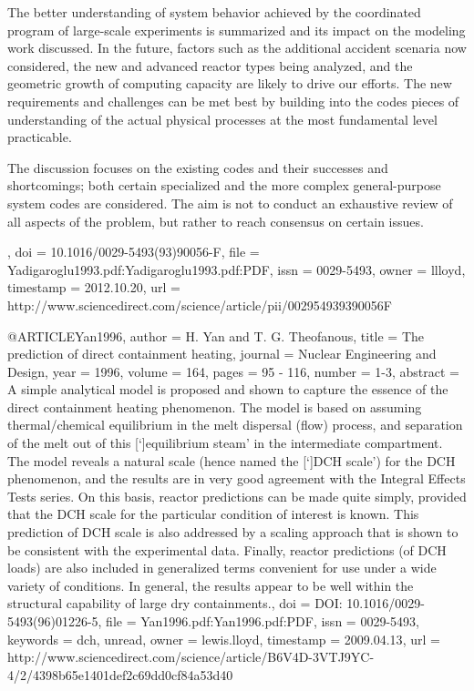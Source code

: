 {{{{	The better understanding of system behavior achieved by the coordinated
	program of large-scale experiments is summarized and its impact on
	the modeling work discussed. In the future, factors such as the additional
	accident scenaria now considered, the new and advanced reactor types
	being analyzed, and the geometric growth of computing capacity are
	likely to drive our efforts. The new requirements and challenges
	can be met best by building into the codes pieces of understanding
	of the actual physical processes at the most fundamental level practicable.
	
	The discussion focuses on the existing codes and their successes and
	shortcomings; both certain specialized and the more complex general-purpose
	system codes are considered. The aim is not to conduct an exhaustive
	review of all aspects of the problem, but rather to reach consensus
	on certain issues.},
  doi = {10.1016/0029-5493(93)90056-F},
  file = {Yadigaroglu1993.pdf:Yadigaroglu1993.pdf:PDF},
  issn = {0029-5493},
  owner = {llloyd},
  timestamp = {2012.10.20},
  url = {http://www.sciencedirect.com/science/article/pii/002954939390056F}
}

@ARTICLE{Yan1996,
  author = {H. Yan and T. G. Theofanous},
  title = {The prediction of direct containment heating},
  journal = {Nuclear Engineering and Design},
  year = {1996},
  volume = {164},
  pages = {95 - 116},
  number = {1-3},
  abstract = {A simple analytical model is proposed and shown to capture the essence
	of the direct containment heating phenomenon. The model is based
	on assuming thermal/chemical equilibrium in the melt dispersal (flow)
	process, and separation of the melt out of this [`]equilibrium steam'
	in the intermediate compartment. The model reveals a natural scale
	(hence named the [`]DCH scale') for the DCH phenomenon, and the results
	are in very good agreement with the Integral Effects Tests series.
	On this basis, reactor predictions can be made quite simply, provided
	that the DCH scale for the particular condition of interest is known.
	This prediction of DCH scale is also addressed by a scaling approach
	that is shown to be consistent with the experimental data. Finally,
	reactor predictions (of DCH loads) are also included in generalized
	terms convenient for use under a wide variety of conditions. In general,
	the results appear to be well within the structural capability of
	large dry containments.},
  doi = {DOI: 10.1016/0029-5493(96)01226-5},
  file = {Yan1996.pdf:Yan1996.pdf:PDF},
  issn = {0029-5493},
  keywords = {dch, unread},
  owner = {lewis.lloyd},
  timestamp = {2009.04.13},
  url = {http://www.sciencedirect.com/science/article/B6V4D-3VTJ9YC-4/2/4398b65e1401def2c69dd0cf84a53d40}
}

}}
